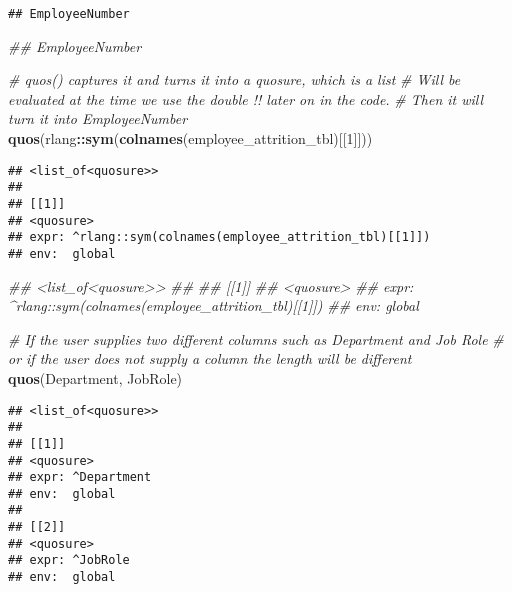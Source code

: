 \documentclass[
]{article}
\newenvironment{Shaded}{\begin{snugshade}}{\end{snugshade}}
\newcommand{\CommentTok}[1]{\textcolor[rgb]{0.56,0.35,0.01}{\textit{#1}}}
\newcommand{\DecValTok}[1]{\textcolor[rgb]{0.00,0.00,0.81}{#1}}
\newcommand{\KeywordTok}[1]{\textcolor[rgb]{0.13,0.29,0.53}{\textbf{#1}}}
\newcommand{\NormalTok}[1]{#1}
\newcommand{\OperatorTok}[1]{\textcolor[rgb]{0.81,0.36,0.00}{\textbf{#1}}}
\newcommand{\StringTok}[1]{\textcolor[rgb]{0.31,0.60,0.02}{#1}}
\begin{document}
\begin{verbatim}
## EmployeeNumber
\end{verbatim}

\begin{Shaded}
\begin{Highlighting}[]
\CommentTok{## EmployeeNumber}

\CommentTok{# quos() captures it and turns it into a quosure, which is a list}
\CommentTok{# Will be evaluated at the time we use the double !! later on in the code.}
\CommentTok{# Then it will turn it into EmployeeNumber}
\KeywordTok{quos}\NormalTok{(rlang}\OperatorTok{::}\KeywordTok{sym}\NormalTok{(}\KeywordTok{colnames}\NormalTok{(employee_attrition_tbl)[[}\DecValTok{1}\NormalTok{]]))}
\end{Highlighting}
\end{Shaded}

\begin{verbatim}
## <list_of<quosure>>
## 
## [[1]]
## <quosure>
## expr: ^rlang::sym(colnames(employee_attrition_tbl)[[1]])
## env:  global
\end{verbatim}

\begin{Shaded}
\begin{Highlighting}[]
\CommentTok{## <list_of<quosure>>}
\CommentTok{##}
\CommentTok{## [[1]]}
\CommentTok{## <quosure>}
\CommentTok{## expr: ^rlang::sym(colnames(employee_attrition_tbl)[[1]])}
\CommentTok{## env:  global}

\CommentTok{# If the user supplies two different columns such as Department and Job Role}
\CommentTok{# or if the user does not supply a column the length will be different}
\KeywordTok{quos}\NormalTok{(Department, JobRole)}
\end{Highlighting}
\end{Shaded}

\begin{verbatim}
## <list_of<quosure>>
## 
## [[1]]
## <quosure>
## expr: ^Department
## env:  global
## 
## [[2]]
## <quosure>
## expr: ^JobRole
## env:  global
\end{verbatim}

\begin{Shaded}
\end{Shaded}
\end{document}
